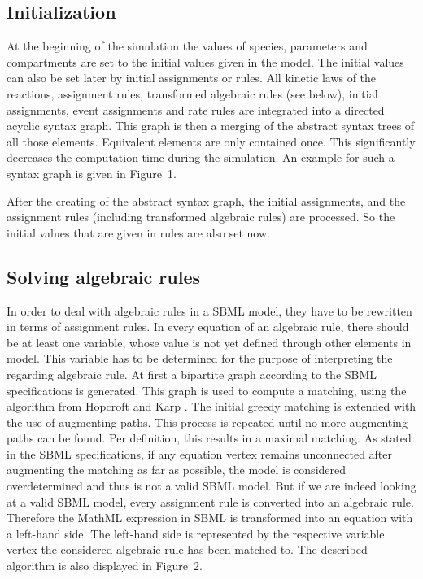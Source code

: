 \documentclass[10pt]{bmc_article}
\newenvironment{bmcformat}{\baselineskip20pt\sloppy\setboolean{publ}{false}}{\baselineskip20pt\sloppy}
\begin{document}
\begin{bmcformat}
\subsection*{Initialization}

At the beginning of the simulation the values of species, parameters and
compartments are set to the initial values given in the model.
The initial values can also be set later by initial assignments or rules.
All kinetic laws of the reactions, assignment rules, transformed algebraic
rules (see below), initial assignments, event assignments and rate rules
are integrated into a directed acyclic syntax graph.
This graph is then a merging of the abstract syntax trees of all those elements.
Equivalent elements are only contained once. This significantly decreases the computation time during the simulation. An example for such a syntax graph is given in Figure~1.

After the creating of the abstract syntax graph, the initial assignments, and the
assignment rules (including transformed algebraic rules) are processed.
So the initial values that are given in rules are also set now.


\subsection*{Solving algebraic rules}
In order to deal with algebraic rules in a SBML model, they have to be rewritten in terms
of assignment rules. In every equation of an algebraic rule, there should be at least one variable, 
whose value is not yet defined through other elements in model. This variable has to be determined 
for the purpose of interpreting the regarding algebraic rule. 
At first a bipartite graph according to the SBML specifications is generated. This graph is used to 
compute a matching, using the algorithm from Hopcroft and Karp
\cite{hopcroft1973n}. The initial greedy matching is extended with the use of augmenting paths. This process is
repeated until no more augmenting paths can be found. Per definition, this results in a maximal matching. 
As stated in the SBML specifications, if any equation vertex remains unconnected after augmenting the 
matching as far as possible, the model is considered overdetermined and thus is not a valid SBML model. 
But if we are indeed looking at a valid SBML model, every assignment rule is converted into an algebraic rule. 
Therefore the MathML expression in SBML is transformed into an equation with a left-hand side. The left-hand 
side is represented by the respective variable vertex the considered algebraic rule has been matched to.
The described algorithm is also displayed in Figure~2.



\end{bmcformat}
\end{document}
